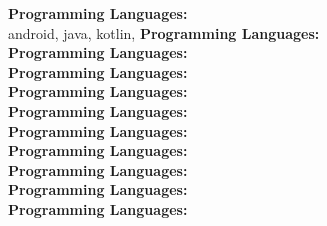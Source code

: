 \textbf{Programming Languages:} \\
android, java, kotlin, \textbf{Programming Languages:} \\
\textbf{Programming Languages:} \\
\textbf{Programming Languages:} \\
\textbf{Programming Languages:} \\
\textbf{Programming Languages:} \\
\textbf{Programming Languages:} \\
\textbf{Programming Languages:} \\
\textbf{Programming Languages:} \\
\textbf{Programming Languages:} \\
\textbf{Programming Languages:} \\
